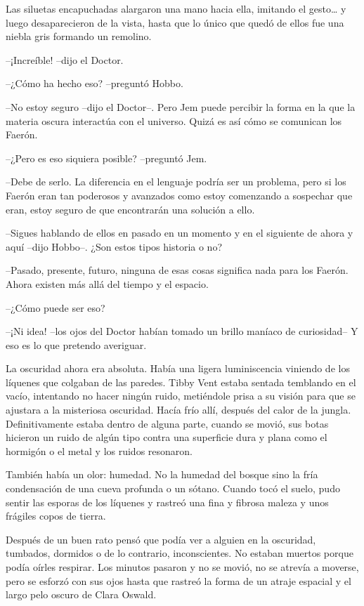 {Las siluetas encapuchadas alargaron una mano hacia ella, imitando el
 gesto\ldots{} y luego desaparecieron de la vista, hasta que lo único que
quedó de ellos fue una niebla gris formando un remolino.}

{--¡Increíble! --dijo el Doctor.}

{--¿Cómo ha hecho eso? --preguntó Hobbo.}

{--No estoy seguro --dijo el Doctor--. Pero Jem puede percibir la forma
 en la que la materia oscura interactúa con el universo. Quizá es así
cómo se comunican los Faerón.}

{--¿Pero es eso siquiera posible? --preguntó Jem.}

{--Debe de serlo. La diferencia en el lenguaje podría ser un problema,
 pero si los Faerón eran tan poderosos y avanzados como estoy comenzando
 a sospechar que eran, estoy seguro de que encontrarán una solución a
ello.}

{--Sigues hablando de ellos en pasado en un momento y en el siguiente de
ahora y aquí --dijo Hobbo--. ¿Son estos tipos historia o no?}

{--Pasado, presente, futuro, ninguna de esas cosas significa nada para
los Faerón. Ahora existen más allá del tiempo y el espacio.}

{--¿Cómo puede ser eso?}

{--¡Ni idea! --los ojos del Doctor habían tomado un brillo maníaco de
 curiosidad-- Y eso es lo que pretendo averiguar.}

{La
 oscuridad ahora era absoluta. Había una ligera luminiscencia viniendo de
 los líquenes que colgaban de las paredes. Tibby Vent estaba sentada
 temblando en el vacío, intentando no hacer ningún ruido, metiéndole
 prisa a su visión para que se ajustara a la misteriosa oscuridad. Hacía
 frío allí, después del calor de la jungla. Definitivamente estaba dentro
 de alguna parte, cuando se movió, sus botas hicieron un ruido de algún
 tipo contra una superficie dura y plana como el hormigón o el metal y
los ruidos resonaron.}

{También había un olor: humedad. No la humedad del bosque sino la fría
 condensación de una cueva profunda o un sótano. Cuando tocó el suelo,
 pudo sentir las esporas de los líquenes y rastreó una fina y fibrosa
maleza y unos frágiles copos de tierra.}

{Después de un buen rato pensó que podía ver a alguien en la oscuridad,
 tumbados, dormidos o de lo contrario, inconscientes. No estaban muertos
 porque podía oírles respirar. Los minutos pasaron y no se movió, no se
 atrevía a moverse, pero se esforzó con sus ojos hasta que rastreó la
forma de un atraje espacial y el largo pelo oscuro de Clara Oswald.}


